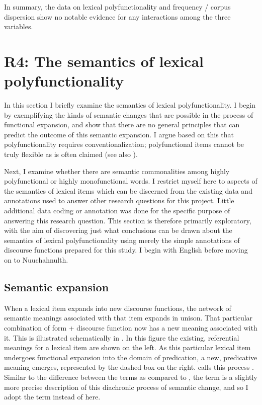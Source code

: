 In summary, the data on lexical polyfunctionality and frequency / corpus dispersion show no notable evidence for any interactions among the three variables.

\section{R4: The semantics of lexical polyfunctionality}
\label{sec:4.6}

In this section I briefly examine the semantics of lexical polyfunctionality. I begin by exemplifying the kinds of semantic changes that are possible in the process of functional expansion, and show that there are no general principles that can predict the outcome of this semantic expansion. I argue based on this that polyfunctionality requires conventionalization; polyfunctional items cannot be truly flexible as is often claimed (see also ).

Next, I examine whether there are semantic commonalities among highly polyfunctional or highly monofunctional words. I restrict myself here to aspects of the semantics of lexical items which can be discerned from the existing data and annotations used to answer other research questions for this project. Little additional data coding or annotation was done for the specific purpose of answering this research question. This section is therefore primarily exploratory, with the aim of discovering just what conclusions can be drawn about the semantics of lexical polyfunctionality using merely the simple annotations of discourse functions prepared for this study. I begin with English before moving on to Nuuchahnulth.

\subsection{Semantic expansion}
\label{sec:4.6.1}

When a lexical item expands into new discourse functions, the network of semantic meanings associated with that item expands in unison. That particular combination of form + discourse function now has a new meaning associated with it. This is illustrated schematically in . In this figure the existing, referential meanings for a lexical item are shown on the left. As this particular lexical item undergoes functional expansion into the domain of predication, a new, predicative meaning emerges, represented by the dashed box on the right. \textcites[74--77]{Croft1991}[73]{Croft2001b} calls this process . Similar to the difference between the terms  as compared to , the term  is a slightly more precise description of this diachronic process of semantic change, and so I adopt the term  instead of  here.

